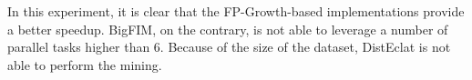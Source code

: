 \documentclass[preprint,review,12pt]{elsarticle}
\begin{document}
In this experiment, it is clear that the FP-Growth-based implementations provide a better speedup. 
BigFIM, on the contrary, is not able to leverage a number of parallel tasks higher than 6.
Because of the size of the dataset, DistEclat is not able to perform the mining. 
%
\end{document}
